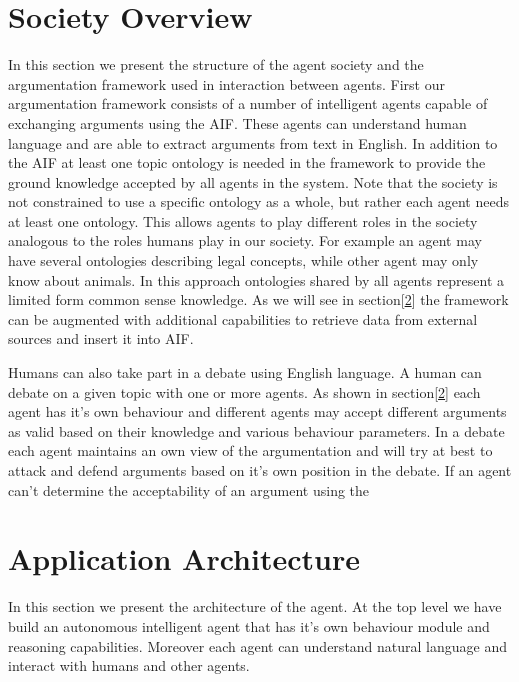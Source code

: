 
\section{Society Overview}
\label{sec:society}

In this section we present the structure of the agent society and the argumentation framework used in interaction between agents. First our argumentation framework consists of a number of intelligent agents capable of exchanging arguments using the AIF\cite{AIF}. These agents can understand human language and are able to extract arguments from text in English. In addition to the AIF at least one topic ontology is needed in the framework to provide the ground knowledge accepted by all agents in the system. Note that the society is not constrained to use a specific ontology as a whole, but rather each agent needs at least one ontology. This allows agents to play different roles in the society analogous to the roles humans play in our society. For example an agent may have several ontologies describing legal concepts, while other agent may only know about animals. In this approach ontologies shared by all agents represent a limited form common sense knowledge. As we will see in section[\ref{sec:application}] the framework can be augmented with additional capabilities to retrieve data from external sources and insert it into AIF. 

Humans can also take part in a debate using English language. A human can debate on a given topic with one or more agents. As shown in section[\ref{sec:application}] each agent has it's own behaviour and different agents may accept different arguments as valid based on their knowledge and various behaviour parameters. In a debate each agent maintains an own view of the argumentation and will try at best to attack and defend arguments based on it's own position in the debate. If an agent can't determine the acceptability of an argument using the 

\section{Application Architecture}
\label{sec:application}

In this section we present the architecture of the agent. At the top level we have build an autonomous intelligent agent that has it's own behaviour module and reasoning capabilities. Moreover each agent can understand natural language and interact with humans and other agents.

